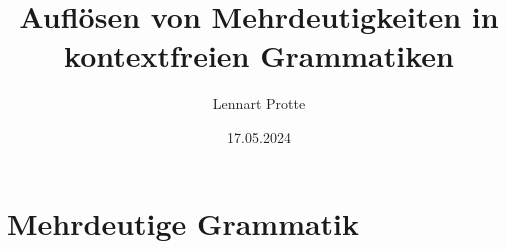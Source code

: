 \documentclass[t]{beamer}
\begin{document}

    \title{Auflösen von Mehrdeutigkeiten in kontextfreien Grammatiken}
    \date{17.05.2024}
    \author{Lennart Protte}

    \frame{\titlepage}


    \section{Mehrdeutige Grammatik}\label{sec:mehrdeutige-grammatik2}
\end{document}
